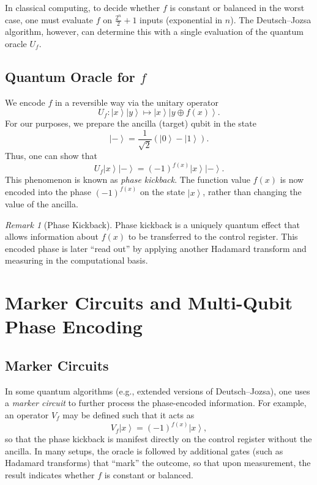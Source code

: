 \documentclass[11pt,oneside]{book}
\theoremstyle{remark}
\newtheorem*{remark}{Remark}
\renewcommand{\ket}[1]{\left|#1\right\rangle}      %
\newcommand{\xor}{\oplus}                        %
\begin{document}
	In classical computing, to decide whether \( f \) is constant or balanced in the worst case, one must evaluate \( f \) on \(\frac{2^n}{2} + 1\) inputs (exponential in \( n \)). The Deutsch--Jozsa algorithm, however, can determine this with a single evaluation of the quantum oracle \( U_f \).
	
	\section{Quantum Oracle for \( f \)}
	
	We encode \( f \) in a reversible way via the unitary operator
	\[
	U_f : \ket{x}\ket{y} \mapsto \ket{x}\ket{y \xor f(x)}.
	\]
	For our purposes, we prepare the ancilla (target) qubit in the state
	\[
	\ket{-} = \frac{1}{\sqrt{2}} \left( \ket{0} - \ket{1} \right).
	\]
	Thus, one can show that
	\[
	U_f \ket{x}\ket{-} = (-1)^{f(x)} \ket{x}\ket{-}.
	\]
	This phenomenon is known as \emph{phase kickback}. The function value \( f(x) \) is now encoded into the phase \( (-1)^{f(x)} \) on the state \( \ket{x} \), rather than changing the value of the ancilla.
	
	\begin{remark}[Phase Kickback]
		Phase kickback is a uniquely quantum effect that allows information about \( f(x) \) to be transferred to the control register. This encoded phase is later “read out” by applying another Hadamard transform and measuring in the computational basis.
	\end{remark}
	
	\chapter{Marker Circuits and Multi-Qubit Phase Encoding}
	
	\section{Marker Circuits}
	
	In some quantum algorithms (e.g., extended versions of Deutsch--Jozsa), one uses a \emph{marker circuit} to further process the phase-encoded information. For example, an operator \( V_f \) may be defined such that it acts as
	\[
	V_f \ket{x} = (-1)^{f(x)} \ket{x},
	\]
	so that the phase kickback is manifest directly on the control register without the ancilla. In many setups, the oracle is followed by additional gates (such as Hadamard transforms) that “mark” the outcome, so that upon measurement, the result indicates whether \( f \) is constant or balanced.
	
\end{document}
